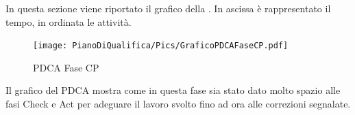 In questa sezione viene riportato il grafico  della . In ascissa è rappresentato il tempo, in ordinata le attività.
\begin{figure}[H]
	\centering
	\texttt{[image: PianoDiQualifica/Pics/GraficoPDCAFaseCP.pdf]}
	\caption{PDCA Fase CP}
\end{figure}
Il grafico del PDCA mostra come in questa fase sia stato dato molto spazio alle fasi Check e Act per adeguare il lavoro svolto fino ad ora alle correzioni segnalate.

							







